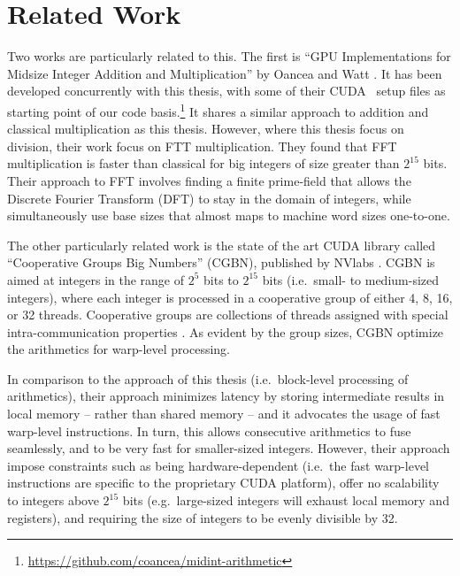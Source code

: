\section{Related Work}
\label{sec:rel}

Two works are particularly related to this. The first is ``GPU Implementations
for Midsize Integer Addition and Multiplication'' by Oancea and Watt
\cite{oancea2024gpu}. It has been developed concurrently with this thesis, with
some of their CUDA \cpp\ setup files as starting point of our code
basis.\footnote{\url{https://github.com/coancea/midint-arithmetic}} It shares a
similar approach to addition and classical multiplication as this
thesis. However, where this thesis focus on division, their work focus on FTT
multiplication. They found that FFT multiplication is faster than classical for
big integers of size greater than $2^{15}$ bits. Their approach to FFT involves
finding a finite prime-field that allows the Discrete Fourier Transform (DFT) to
stay in the domain of integers, while simultaneously use base sizes that almost
maps to machine word sizes one-to-one.

The other particularly related work is the state of the art CUDA library called
``Cooperative Groups Big Numbers'' (CGBN), published by NVlabs \cite{CGBN}. CGBN
is aimed at integers in the range of $2^5$ bits to $2^{15}$ bits (i.e.\ small-
to medium-sized integers), where each integer is processed in a cooperative
group of either 4, 8, 16, or 32 threads. Cooperative groups are collections of
threads assigned with special intra-communication properties
\cite{cudaguide}. As evident by the group sizes, CGBN optimize the arithmetics
for warp-level processing.

In comparison to the approach of this thesis (i.e.\ block-level processing of
arithmetics), their approach minimizes latency by storing intermediate results
in local memory -- rather than shared memory -- and it advocates the usage of fast
warp-level instructions. In turn, this allows consecutive arithmetics to fuse
seamlessly, and to be very fast for smaller-sized integers. However, their
approach impose constraints such as being hardware-dependent (i.e.\ the fast
warp-level instructions are specific to the proprietary CUDA platform), offer no
scalability to integers above $2^{15}$ bits (e.g.\ large-sized integers will
exhaust local memory and registers), and requiring the size of integers to be
evenly divisible by 32. \bigskip

